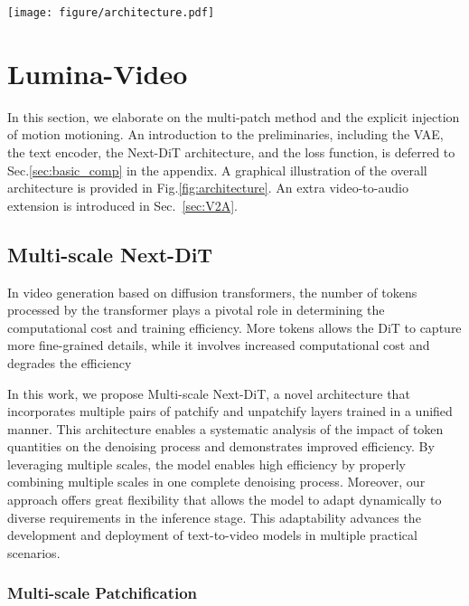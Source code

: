 \begin{figure*}[t]
    \centering
    \texttt{[image: figure/architecture.pdf]}
    \vspace{-1em}
    \caption{Architecture of Lumina-Video with Multi-scale Next-DiT and Motion Conditioning.}
    \label{fig:architecture}
\end{figure*}

\section{Lumina-Video}
\label{sec:method}

In this section, we elaborate on the multi-patch method and the explicit injection of motion motioning. An introduction to the preliminaries, including the VAE, the text encoder, the Next-DiT architecture, and the loss function, is deferred to Sec.\ref{sec:basic_comp} in the appendix. A graphical illustration of the overall architecture is provided in Fig.\ref{fig:architecture}. An extra video-to-audio extension is introduced in Sec.~\ref{sec:V2A}.

\subsection{Multi-scale Next-DiT}
\label{sec:ms-next-dit}

In video generation based on diffusion transformers, the number of tokens processed by the transformer plays a pivotal role in determining the computational cost and training efficiency. More tokens allows the DiT to capture more fine-grained details, while it involves increased computational cost and degrades the efficiency

In this work, we propose Multi-scale Next-DiT, a novel architecture that incorporates multiple pairs of patchify and unpatchify layers trained in a unified manner. This architecture enables a systematic analysis of the impact of token quantities on the denoising process and demonstrates improved efficiency. By leveraging multiple scales, the model enables high efficiency by properly combining multiple scales in one complete denoising process. Moreover, our approach offers great flexibility that allows the model to adapt dynamically to diverse requirements in the inference stage. This adaptability advances the development and deployment of text-to-video models in multiple practical scenarios.

\subsubsection{Multi-scale Patchification}


